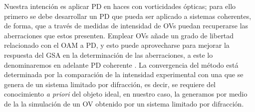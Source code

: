 
Nuestra intención es aplicar PD en haces con vorticidades ópticas; para ello primero se debe desarrollar un PD que pueda ser aplicado a sistemas coherentes, de forma, que a través de medidas de intensidad de OVs puedan recuperarse las aberraciones que estos presenten. Emplear OVs añade un grado de libertad relacionado con el OAM a PD, y esto puede aprovecharse para mejorar la respuesta del GSA en la determinación de las aberraciones, a este lo denominaremos en adelante PD coherente \cite{Echeverri2015}. La convergencia del método está determinada por la comparación de la intensidad experimental con una que se genera de un sistema limitado por difracción, es decir, se requiere del conocimiento \textit{a priori} del objeto ideal, en nuestro caso, la generamos por medio de la la simulación de un OV obtenido por un sistema limitado por difracción.\\

